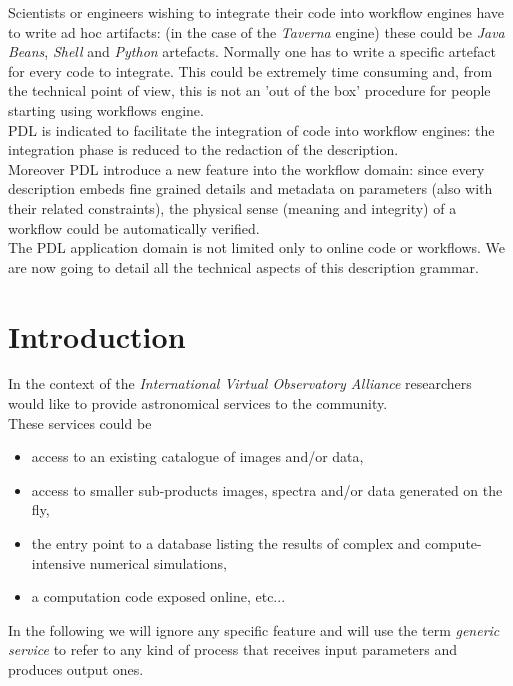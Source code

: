 \documentclass[a4paper,11pt] {ivoa}
\begin{document}
 Scientists or engineers wishing to integrate their code into workflow engines have to write ad hoc artifacts: (in the case of the {\it Taverna} engine) these could be {\it Java Beans}, {\it Shell} and {\it Python} artefacts. Normally one has to write a specific artefact for every code to integrate. This could be extremely time consuming and, from the technical point of view, this is not an 'out of the box' procedure for people starting using workflows engine.\\
PDL is indicated to facilitate the integration of code into workflow engines: the integration phase is reduced to the redaction of the description.\\ 
Moreover PDL introduce a new feature into the workflow domain: since every description embeds fine grained details and metadata on parameters (also with their related constraints), the physical sense (meaning and integrity) of a workflow could be automatically verified.\\

The PDL application domain is not limited only to online code or workflows. We are now going to detail all the technical aspects of this description grammar. 


\section{Introduction}
In the context of the {\it International Virtual Observatory Alliance} researchers would like to
provide astronomical services to the community. \\
These services could be 
\begin{itemize}
\item   access to an existing catalogue of images and/or data,
\item  access to smaller sub-products images, spectra and/or data generated on the fly,
\item  the entry point to a database listing the results of complex and compute-intensive numerical simulations,
\item a computation code exposed online, etc... 
\end{itemize}
In the following we will ignore any specific feature and will use the term {\it generic service} to
refer to any kind of process that receives input parameters and produces output ones.\\
\end{document}
